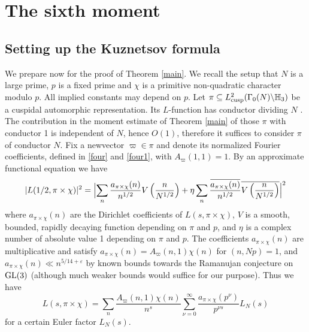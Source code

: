 \documentclass[11pt]{amsart}
\theoremstyle{plain}
\numberwithin{equation}{section}
\theoremstyle{definition}
\begin{document}
 
\section{The sixth moment}

\subsection{Setting up the Kuznetsov formula} We prepare now for the proof of Theorem \ref{main}. We recall the setup that $N$ is a large prime, $p$ is a fixed prime and $\chi$ is a primitive non-quadratic character modulo $p$. All implied constants may depend on $p$. Let $\pi \subseteq L_{\text{cusp}}^2(\Gamma_0(N) \backslash \Bbb{H}_3)$ be a cuspidal automorphic representation. Its $L$-function has conductor dividing $N$ \cite[Th\'eor\`eme]{JPSS}. The contribution in the moment estimate of Theorem \ref{main} of those $\pi$ with conductor 1 is independent of $N$, hence $O(1)$, therefore it suffices to consider $\pi$ of conductor $N$. Fix a newvector $\varpi \in \pi$ and denote its normalized Fourier coefficients, defined in \eqref{four} and \eqref{four1}, with $A_{\varpi}(1, 1) = 1$. 
By an approximate functional equation \cite[Theorem 5.2]{IK} we have 
$$|L(1/2, \pi \times \chi)|^2  =  \Bigl|   \sum_n \frac{a_{\pi \times \chi}(n)}{n^{1/2}} V \left(\frac{n}{N^{1/2}}\right) + \eta \sum_n \frac{\overline{a_{\pi \times \chi}(n)}}{n^{1/2}} \overline{V \left(\frac{n}{N^{1/2}}\right)}\Bigr|^2$$
where $a_{\pi \times\chi}(n)$ are the Dirichlet coefficients of $L(s, \pi \times \chi)$, $V$ is a 
 smooth, bounded, rapidly decaying function   depending on $\pi$ and $p$, and $\eta$ is a complex number of absolute value 1 depending on $\pi$ and $p$. The coefficients $a_{\pi\times \chi}(n)$ are multiplicative and satisfy $a_{\pi \times \chi}(n) = A_{\varpi}(n, 1) \chi(n)$ for $(n, Np) = 1$, and $a_{\pi \times \chi}(n) \ll n^{5/14 + \varepsilon}$ by known bounds towards the Ramanujan conjecture on ${\rm GL}(3)$ (although much weaker bounds would suffice for our purpose). Thus we have
 $$L(s, \pi \times \chi) = \sum_{n} \frac{A_{\varpi}(n, 1) \chi(n)}{n^s}  \sum_{\nu=0}^{\infty} \frac{a_{\pi \times \chi}(p^{\nu})}{p^{\nu s}} L_N(s)$$
 for a certain Euler factor  $L_N(s)$.  
 
\end{document}
